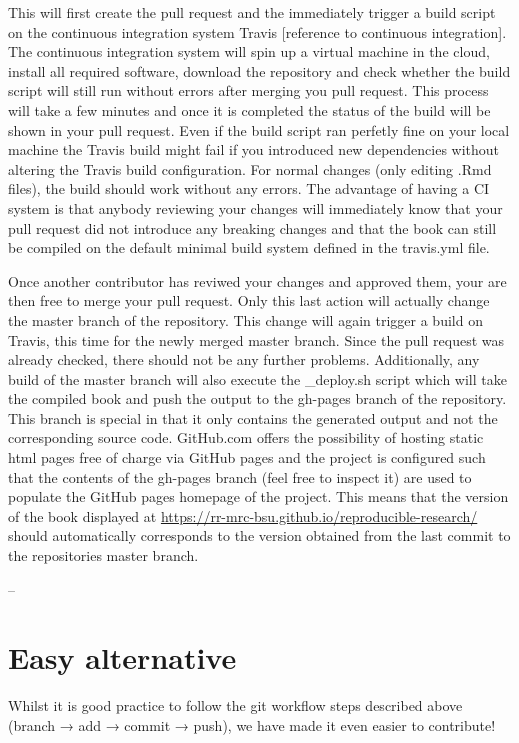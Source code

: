 \documentclass[]{book}
\begin{document}
This will first create the pull request and the immediately trigger a
build script on the continuous integration system Travis {[}reference to
continuous integration{]}. The continuous integration system will spin
up a virtual machine in the cloud, install all required software,
download the repository and check whether the build script will still
run without errors after merging you pull request. This process will
take a few minutes and once it is completed the status of the build will
be shown in your pull request. Even if the build script ran perfetly
fine on your local machine the Travis build might fail if you introduced
new dependencies without altering the Travis build configuration. For
normal changes (only editing .Rmd files), the build should work without
any errors. The advantage of having a CI system is that anybody
reviewing your changes will immediately know that your pull request did
not introduce any breaking changes and that the book can still be
compiled on the default minimal build system defined in the travis.yml
file.

Once another contributor has reviwed your changes and approved them,
your are then free to merge your pull request. Only this last action
will actually change the master branch of the repository. This change
will again trigger a build on Travis, this time for the newly merged
master branch. Since the pull request was already checked, there should
not be any further problems. Additionally, any build of the master
branch will also execute the \_deploy.sh script which will take the
compiled book and push the output to the gh-pages branch of the
repository. This branch is special in that it only contains the
generated output and not the corresponding source code. GitHub.com
offers the possibility of hosting static html pages free of charge via
GitHub pages and the project is configured such that the contents of the
gh-pages branch (feel free to inspect it) are used to populate the
GitHub pages homepage of the project. This means that the version of the
book displayed at
\url{https://rr-mrc-bsu.github.io/reproducible-research/} should
automatically corresponds to the version obtained from the last commit
to the repositories master branch.

--

\section{Easy alternative}\label{easy-alternative}

Whilst it is good practice to follow the git workflow steps described
above (branch → add → commit → push), we have made it even easier to
contribute!
\end{document}

